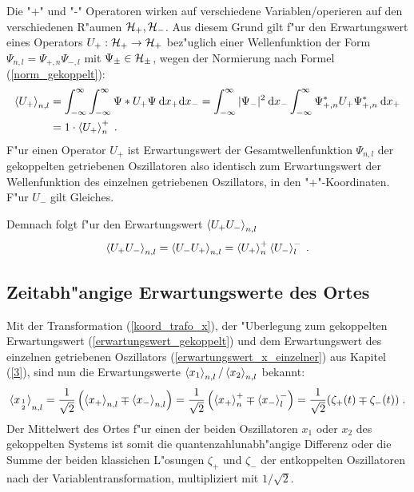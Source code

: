   Die "+" und "-" Operatoren wirken auf verschiedene Variablen/operieren auf den verschiedenen R"aumen $\cal H_+,\cal H_-$.
  Aus diesem Grund gilt f"ur den Erwartungswert eines Operators $U_+:\cal H_+ \rightarrow \cal H_+$ bez"uglich einer Wellenfunktion der Form $\Psi_{n,l}=\Psi_{+,n}\Psi_{-,l}$ mit $\Psi_\pm \in \cal H_\pm$, wegen der Normierung nach Formel (\ref{norm_gekoppelt}):
  \begin{align}
    \braket{U_+}_{n,l} &= \int_{-\infty}^{\infty}\int_{-\infty}^{\infty} \Psi*U_+\Psi \: \text dx_+ \text dx_-
    = \int_{-\infty}^{\infty} |\Psi_-|^2 \: \text dx_- \int_{-\infty}^{\infty} \Psi_{+,n}^*U_+\Psi_{+,n}^* \: \text dx_+ \notag\\
    &= 1 \cdot \braket{U_+}_n^+ \; .
    \label{erwartungswert_gekoppelt}
  \end{align}
  F"ur einen Operator $U_+$ ist Erwartungswert der Gesamtwellenfunktion $\Psi_{n,l}$ der gekoppelten getriebenen Oszillatoren also identisch zum Erwartungswert der Wellenfunktion des einzelnen getriebenen Oszillators, in den "+"-Koordinaten.
  F"ur $U_-$ gilt Gleiches.

  Demnach folgt f"ur den Erwartungswert $\braket{U_+U_-}_{n,l}$
  \begin{equation}
    \braket{U_+U_-}_{n,l}=\braket{U_-U_+}_{n,l} = \braket{U_+}_n^+\braket{U_-}_l^- \; .
    \label{erwartungswert_gekoppelt_produkt}
  \end{equation}


  \subsection{Zeitabh"angige Erwartungswerte des Ortes}
    Mit der Transformation (\ref{koord_trafo_x}), der "Uberlegung zum gekoppelten Erwartungswert (\ref{erwartungswert_gekoppelt}) und dem Erwartungswert des einzelnen getriebenen Oszillators (\ref{erwartungswert_x_einzelner}) aus Kapitel (\ref{3}), sind nun die Erwartungswerte
    $\braket{x_1}_{n,l}/\braket{x_2}_{n,l}$ bekannt:
    \begin{align}
      \braket{x_{1 \atop 2}}_{n,l}=\frac{1}{\sqrt{2}}\left(\braket{x_+}_{n,l}\mp\braket{x_-}_{n,l}\right)
      =\frac{1}{\sqrt{2}}\left(\braket{x_+}_n^+\mp\braket{x_-}_l^-\right)
      =\frac{1}{\sqrt{2}}(\zeta_+(t)\mp\zeta_-(t)) \; .
    \end{align}
    Der Mittelwert des Ortes f"ur einen der beiden Oszillatoren $x_1$ oder $x_2$ des gekoppelten Systems ist somit die quantenzahlunabh"angige Differenz oder die Summe der beiden klassichen L"osungen $\zeta_+$ und $\zeta_-$ der entkoppelten Oszillatoren nach der Variablentransformation, multipliziert mit $1/\sqrt 2$.

